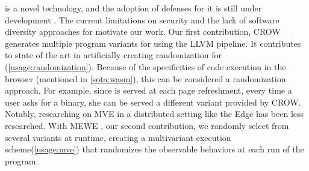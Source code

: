 \wasm is a novel technology, and the adoption of defenses for it is still under development \cite{Narayan2021Swivel, johnson2021}. The current limitations on security and the lack of software diversity approaches for \wasm motivate our work.
Our first contribution, CROW \cite{CROW} generates multiple program variants for \wasm using the LLVM pipeline.
It contributes to state of the art in artificially creating randomization for \wasm (\autoref{usage:randomization}). Because of the specificities of code execution in the browser (mentioned in \autoref{sota:wasm}), this can be considered a randomization approach. For example, since \wasm is served at each page refreshment, every time a user asks for a \wasm binary, she can be served a different variant provided by CROW. 
Notably, researching on MVE in a distributed setting like the Edge \citationneeded has been less researched. With MEWE \cite{MEWE}, our second contribution, we randomly select from several variants at runtime, creating a multivariant execution scheme(\autoref{usage:mve}) that randomizes the observable behaviors at each run of the program. %





